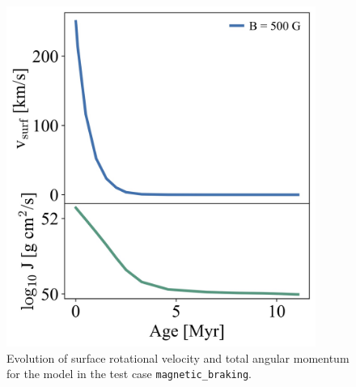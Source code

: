 \documentclass{article}
\begin{document}
 
 

\begin{figure}
  \begin{center}
    \includegraphics[width=0.9\textwidth]{vsurf.jpg}
  \end{center}
  \caption{Evolution of surface rotational velocity and total angular momentum for the model in the test case \texttt{magnetic\_braking}.}
  \label{vsurf}
\end{figure}

 
\end{document}
